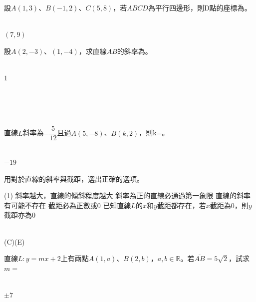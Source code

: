 \documentclass
[answers]
{exam}
\newcommand\ul[1]{\uline{\hspace*{#1}}}
\theoremstyle{definition}
\begin{document}
\begin{questions}

\question
設$A \left( 1,3\right)$、$B \left( -1,2\right)$、$C \left( 5,8\right)$，若$ABCD$為平行四邊形，則D點的座標為\ul{50pt}。
\\ 

\begin{solution}~\\
	$\left( 7,9 \right)$
\end{solution}

\question

設$A\left( 2,-3\right)$、$\left( 1,-4\right)$，求直線$AB$的斜率為\ul{50pt}。
\\ 
\begin{solution}~\\
	$1$
\end{solution}

$ $\\$ $\\$ $\\
\question

直線$L$斜率為$-\dfrac{5}{12}$且過$A\left( 5,-8\right)$、$B \left( k,2\right)$，則k=\ul{50pt}。
\\ 
\begin{solution}~\\
	$-19$
\end{solution}


\question

用對於直線的斜率與截距，選出正確的選項。
\begin{tasks}(1)
	\task 斜率越大，直線的傾斜程度越大
	\task 斜率為正的直線必通過第一象限
	\task 直線的斜率有可能不存在
	\task 截距必為正數或$0$
	\task 已知直線$L$的$x$和$y$截距都存在，若$x$截距為$0$，則$y$截距亦為$0$
\end{tasks}
\begin{solution}~\\
	(C)(E)
\end{solution}

\question

直線$L:y=mx + 2$上有兩點$A \left( 1,a\right)$、$B \left( 2,b \right)$，$a,b \in \mathbb{R}$。若$\overline{AB}=5\sqrt{2}$，試求$m=$\ul{50pt}
\\ 
\begin{solution}~\\
	$\pm7$
\end{solution}


\end{questions}
\end{document}
